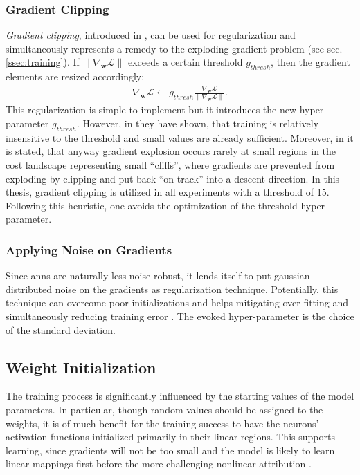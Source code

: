 \subsubsection{Gradient Clipping}
\textit{Gradient clipping}, introduced in \cite{PaMi2012}, can be used for regularization and simultaneously represents a remedy to the exploding gradient problem (see sec. \ref{ssec:training}).
If $\|\nabla_{\bm w}\mathcal L\|$ exceeds a certain threshold $g_{thresh}$, then the gradient elements are resized accordingly:
\begin{align}
	\nabla_{\bm w}\mathcal L\gets g_{thresh}\frac{\nabla_{\bm w}\mathcal L}{\|\nabla_{\bm w}\mathcal L\|}.
\end{align}
This regularization is simple to implement but it introduces the new hyper-parameter $g_{thresh}$.
However, in \cite{PaMi2012} they have shown, that training is relatively insensitive to the threshold and small values are already sufficient.
Moreover, in \cite{BeBou2013} it is stated, that anyway gradient explosion occurs rarely at small regions in the cost landscape representing small ``cliffs'', where gradients are prevented from exploding by clipping and put back ``on track'' into a descent direction.  
In this thesis, gradient clipping is utilized in all experiments with a threshold of 15.
Following this heuristic, one avoids the optimization of the threshold hyper-parameter.

\subsubsection{Applying Noise on Gradients}
Since \glspl{ann} are naturally less noise-robust, it lends itself to put gaussian distributed noise on the gradients as regularization technique.
Potentially, this technique can overcome poor initializations and helps mitigating over-fitting and simultaneously reducing training error \cite{NeVi2015}.
The evoked hyper-parameter is the choice of the standard deviation.

\subsection{Weight Initialization}
\label{ssec:init}
The training process is significantly influenced by the starting values of the model parameters.
In particular, though random values should be assigned to the weights, it is of much benefit for the training success to have the neurons' activation functions initialized primarily in their linear regions.
This supports learning, since gradients will not be too small and the model is likely to learn linear mappings first before the more challenging nonlinear attribution \cite{LeBo1998}.

